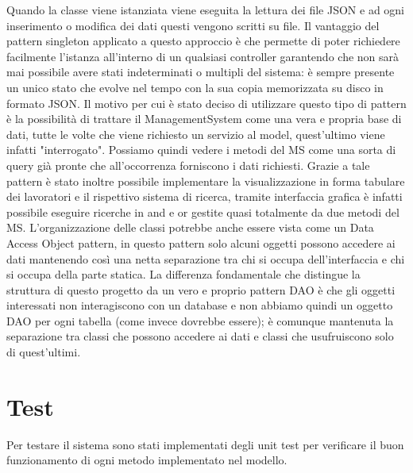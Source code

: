 \documentclass[ 4paper,11pt,openany]{book}
\begin{document}
Quando la classe viene istanziata viene eseguita la lettura dei file JSON e ad ogni inserimento o modifica dei dati questi vengono scritti su file.
Il vantaggio del pattern singleton applicato a questo approccio è che permette di poter richiedere facilmente l'istanza all'interno di un qualsiasi controller garantendo che non sarà mai possibile avere stati indeterminati o multipli del sistema: è sempre presente un unico stato che evolve nel tempo con la sua copia memorizzata su disco in formato JSON.
Il motivo per cui è stato deciso di utilizzare questo tipo di pattern è la possibilità di trattare il ManagementSystem come una vera e propria base di dati, tutte le volte che viene richiesto un servizio al model, quest'ultimo viene infatti "interrogato". Possiamo quindi vedere i metodi del MS come una sorta di query già pronte che all'occorrenza forniscono i dati richiesti. Grazie a tale pattern è stato inoltre possibile implementare la visualizzazione in forma tabulare dei lavoratori e il rispettivo sistema di ricerca, tramite interfaccia grafica è infatti possibile eseguire ricerche in and e or gestite quasi totalmente da due metodi del MS.
L'organizzazione delle classi potrebbe anche essere vista come un Data Access Object pattern, in questo pattern solo alcuni oggetti possono accedere ai dati mantenendo così una netta separazione tra chi si occupa dell'interfaccia e chi si occupa della parte statica.
La differenza fondamentale che distingue la struttura di questo progetto da un vero e proprio pattern DAO è che gli oggetti interessati non interagiscono con un database e non abbiamo quindi un oggetto DAO per ogni tabella (come invece dovrebbe essere); è comunque mantenuta la separazione tra classi che possono accedere ai dati e classi che usufruiscono solo di quest'ultimi. 

\chapter{Test}
Per testare il sistema sono stati implementati degli unit test per verificare il buon funzionamento di ogni metodo implementato nel modello.
\end{document}
